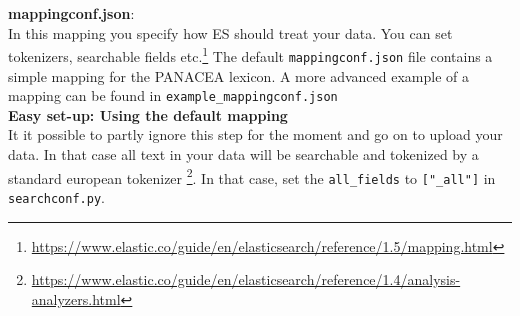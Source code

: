 \documentclass[
12pt, %
a4paper, %
oneside, %
headinclude,footinclude, %
BCOR0mm, %
]{scrartcl}
\begin{document}
%
%




\textbf{mappingconf.json}:\\
  In this mapping you specify how ES should treat your data. You can set
  tokenizers, searchable fields
  etc.\footnote{\url{https://www.elastic.co/guide/en/elasticsearch/reference/1.5/mapping.html}} The default \verb|mappingconf.json| file contains a simple mapping for the PANACEA lexicon. A more advanced example of a mapping can be found in \verb|example_mappingconf.json|\\
%
  \textbf{Easy set-up: Using the default mapping}\\
  It it possible to partly ignore this step for the moment and go on to upload your data. In that
  case all text in your data will be searchable and tokenized by a standard european tokenizer%
  \footnote{\url{https://www.elastic.co/guide/en/elasticsearch/reference/1.4/analysis-analyzers.html}}.
  In that case, set the \verb|all_fields| to \verb|["_all"]| in \verb|searchconf.py|.
\end{document}
